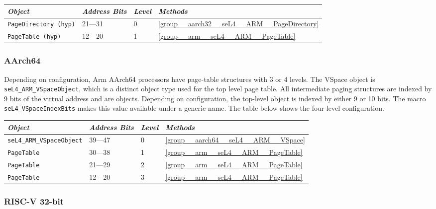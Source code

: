 \begin{tabularx}{\textwidth}{Xlll} \toprule
  \emph{Object}          & \emph{Address Bits} & \emph{Level} & \emph{Methods} \\ \midrule
  \texttt{PageDirectory (hyp)} & 21---31     & 0            & \autoref{group__aarch32__seL4__ARM__PageDirectory} \\
  \texttt{PageTable (hyp)}     & 12---20     & 1            & \autoref{group__arm__seL4__ARM__PageTable} \\
  \bottomrule
\end{tabularx}

\subsubsection{AArch64}

Depending on configuration, Arm AArch64 processors have page-table structures with 3 or 4 levels.
The VSpace object is \texttt{seL4\_ARM\_VSpaceObject}, which is a distinct object type used for the
top level page table. All intermediate paging structures are indexed by 9 bits of the virtual
address and are  objects. Depending on configuration, the top-level object is
indexed by either 9 or 10 bits. The macro \texttt{seL4\_VSpaceIndexBits} makes this value available
under a generic name. The table below shows the four-level configuration.

\begin{tabularx}{\textwidth}{Xlll} \toprule
\emph{Object}                    & \emph{Address Bits} & \emph{Level} & \emph{Methods} \\ \midrule
    \texttt{seL4\_ARM\_VSpaceObject}
                                 & 39---47             & 0            & \autoref{group__aarch64__seL4__ARM__VSpace} \\
    \texttt{PageTable}           & 30---38             & 1            & \autoref{group__arm__seL4__ARM__PageTable} \\
    \texttt{PageTable}           & 21---29             & 2            & \autoref{group__arm__seL4__ARM__PageTable} \\
    \texttt{PageTable}           & 12---20             & 3            & \autoref{group__arm__seL4__ARM__PageTable} \\
\bottomrule
\end{tabularx}

\subsubsection{RISC-V 32-bit}

